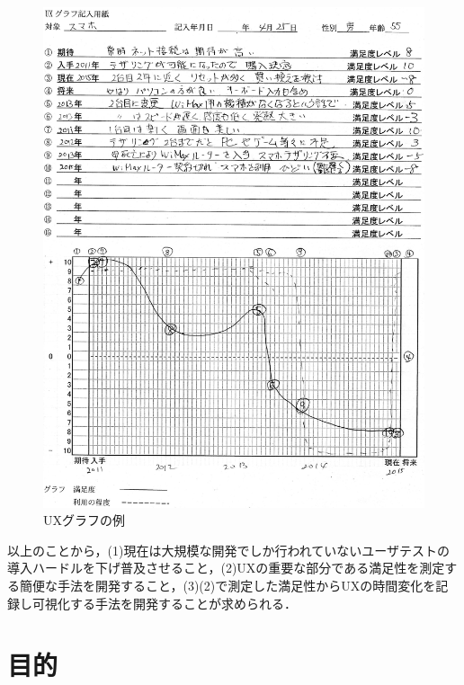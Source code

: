 \begin{figure}[htbp]
  \begin{minipage}{\hsize}
    \begin{center}
       \includegraphics[width=160mm]{img/uxgraph.jpeg}
    \end{center}
    \caption{UXグラフの例\cite{usite}}
    \label{fig:uxgraph}
  \end{minipage}
\end{figure}

以上のことから，(1)現在は大規模な開発でしか行われていないユーザテストの導入ハードルを下げ普及させること，(2)UXの重要な部分である満足性を測定する簡便な手法を開発すること，(3)(2)で測定した満足性からUXの時間変化を記録し可視化する手法を開発することが求められる．


\section{目的}


